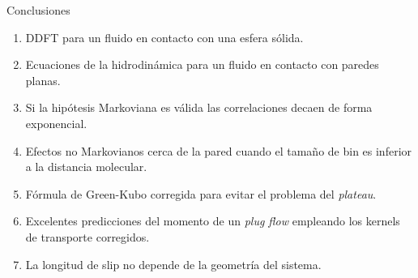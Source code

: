 \documentclass{beamer}
\begin{document}
\begin{frame}{Conclusiones}
  \begin{enumerate}
    \item<1-> DDFT para un fluido en contacto con una esfera sólida. 
    \item<2-> Ecuaciones de la hidrodinámica para un fluido en contacto con paredes planas. 
    \item<3-> Si la hipótesis Markoviana es válida las correlaciones decaen de forma exponencial. 
    \item<4-> Efectos no Markovianos cerca de la pared cuando el tamaño de bin es inferior a la distancia molecular. 
    \item<5-> Fórmula de Green-Kubo corregida para evitar el problema del \textit{plateau}.
    \item<6-> Excelentes predicciones del momento de un \textit{plug flow} empleando los kernels de transporte corregidos. 
    \item<7-> La longitud de slip no depende de la geometría del sistema.  
  \end{enumerate}
\end{frame}


\end{document}
